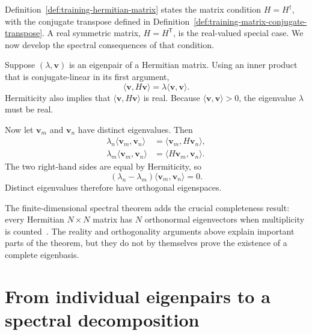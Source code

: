 Definition~\ref{def:training-hermitian-matrix} states the matrix condition
\(H=H^{\dagger}\), with the conjugate transpose defined in
Definition~\ref{def:training-matrix-conjugate-transpose}. A real symmetric matrix,
\(H=H^{\mathsf T}\), is the real-valued special case. We now develop the
spectral consequences of that condition.

Suppose \((\lambda,\mathbf v)\) is an eigenpair of a Hermitian matrix. Using an
inner product that is conjugate-linear in its first argument,
\begin{equation}
  \langle\mathbf v,H\mathbf v\rangle
  =\lambda\langle\mathbf v,\mathbf v\rangle.
\end{equation}
Hermiticity also implies that
\(\langle\mathbf v,H\mathbf v\rangle\) is real. Because
\(\langle\mathbf v,\mathbf v\rangle>0\), the eigenvalue \(\lambda\) must be
real.

Now let \(\mathbf v_m\) and \(\mathbf v_n\) have distinct eigenvalues. Then
\begin{align}
  \lambda_n\langle\mathbf v_m,\mathbf v_n\rangle
  &=\langle\mathbf v_m,H\mathbf v_n\rangle,\\
  \lambda_m\langle\mathbf v_m,\mathbf v_n\rangle
  &=\langle H\mathbf v_m,\mathbf v_n\rangle.
\end{align}
The two right-hand sides are equal by Hermiticity, so
\begin{equation}
  (\lambda_n-\lambda_m)
  \langle\mathbf v_m,\mathbf v_n\rangle=0.
\end{equation}
Distinct eigenvalues therefore have orthogonal eigenspaces.

The finite-dimensional spectral theorem adds the crucial completeness result:
every Hermitian \(N\times N\) matrix has \(N\) orthonormal eigenvectors when
multiplicity is counted~\cite{hornJohnson2013}. The reality and
orthogonality arguments above explain
important parts of the theorem, but they do not by themselves prove the
existence of a complete eigenbasis.

\section{From individual eigenpairs to a spectral decomposition}

